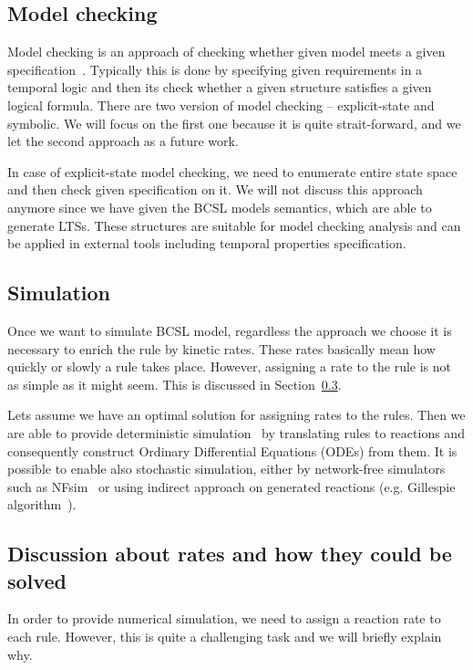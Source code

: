 \documentclass[12pt]{fithesis2}
\begin{document}
\subsection{Model checking}

Model checking is an approach of checking whether given model meets a given specification~\cite{clarke1999model}. Typically this is done by specifying given requirements in a temporal logic and then its check whether a given structure satisfies a given logical formula. There are two version of model checking -- explicit-state and symbolic. We will focus on the first one because it is quite strait-forward, and we let the second approach as a future work.

In case of explicit-state model checking, we need to enumerate entire state space and then check given specification on it. We will not discuss this approach anymore since we have given the BCSL models semantics, which are able to generate LTSs. These structures are suitable for model checking analysis and can be applied in external tools including temporal properties specification.

\subsection{Simulation}
\label{simulation}

Once we want to simulate BCSL model, regardless the approach we choose it is necessary to enrich the rule by kinetic rates. These rates basically mean how quickly or slowly a rule takes place. However, assigning a rate to the rule is not as simple as it might seem. This is discussed in Section~\ref{rates_discussion}.

Lets assume we have an optimal solution for assigning rates to the rules. Then we are able to provide deterministic simulation~\cite{Poole2000} by translating rules to reactions and consequently construct Ordinary Differential Equations (ODEs) from them. It is possible to enable also stochastic simulation, either by network-free simulators such as NFsim~\cite{sneddon2011efficient} or using indirect approach on generated reactions (e.g. Gillespie algorithm~\cite{GILLESPIE1976403}).

\subsection{Discussion about rates and how they could be solved}
\label{rates_discussion}

In order to provide numerical simulation, we need to assign a reaction rate to each rule. However, this is quite a challenging task and we will briefly explain why.
\end{document}
